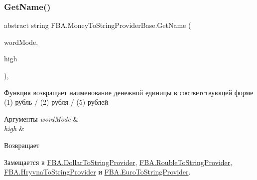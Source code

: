 \mbox{\label{class_f_b_a_1_1_money_to_string_provider_base_aea712eaf4a5d84eed5624e3d48988502}} 
\subsubsection{\texorpdfstring{Get\+Name()}{GetName()}}
{\footnotesize\ttfamily abstract string F\+B\+A.\+Money\+To\+String\+Provider\+Base.\+Get\+Name (\begin{DoxyParamCaption}\item[{Number\+To\+Russian\+String.\+Word\+Mode}]{word\+Mode,  }\item[{bool}]{high }\end{DoxyParamCaption})\hspace{0.3cm}{\ttfamily [protected]}, {}}



Функция возвращает наименование денежной единицы в соответствующей форме (1) рубль / (2) рубля / (5) рублей 


\begin{DoxyParams}{Аргументы}
{\em word\+Mode} & \\
\hline
{\em high} & \\
\hline
\end{DoxyParams}
\begin{DoxyReturn}{Возвращает}

\end{DoxyReturn}


Замещается в \mbox{\hyperlink{class_f_b_a_1_1_dollar_to_string_provider_aa76306e1936425f5c39e70ccdd79ba7a}{F\+B\+A.\+Dollar\+To\+String\+Provider}}, \mbox{\hyperlink{class_f_b_a_1_1_rouble_to_string_provider_ac31a975f1a81e576344d431956bd6e5a}{F\+B\+A.\+Rouble\+To\+String\+Provider}}, \mbox{\hyperlink{class_f_b_a_1_1_hryvna_to_string_provider_a7e7f7d7ca730dcb617c9218ca91866ef}{F\+B\+A.\+Hryvna\+To\+String\+Provider}} и \mbox{\hyperlink{class_f_b_a_1_1_euro_to_string_provider_a6b40c1dc54b209d90c3440b0c76b5bbe}{F\+B\+A.\+Euro\+To\+String\+Provider}}.

\mbox{\label{class_f_b_a_1_1_money_to_string_provider_base_a88f493205be3da3950e2175f1e033595}} 
